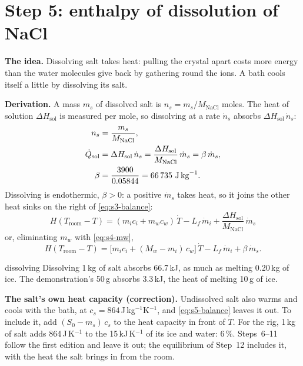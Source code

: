 \documentclass[11pt,a4paper]{article}
\newcommand{\Troom}{T_{\mathrm{room}}}
\newcommand{\Hsol}{\Delta H_{\mathrm{sol}}}
\newcommand{\MN}{M_{\mathrm{NaCl}}}
\newcommand{\para}[1]{\par\smallskip\noindent\textbf{#1}\enspace}
\begin{document}
\section{Step 5: enthalpy of dissolution of NaCl}\label{sec:s5}

\para{The idea.} Dissolving salt takes heat: pulling the crystal apart costs more energy than the water
molecules give back by gathering round the ions. A bath cools itself a little by dissolving its salt.

\para{Derivation.} A mass $m_s$ of dissolved salt is $n_s = m_s/\MN$ moles. The heat of solution $\Hsol$ is
measured per mole, so dissolving at a rate $\dot n_s$ absorbs $\Hsol\,\dot n_s$:
\begin{align}
n_s &= \frac{m_s}{\MN}, \label{eq:s5-ns}\\
\dot Q_{\mathrm{sol}} &= \Hsol\,\dot n_s = \frac{\Hsol}{\MN}\,\dot m_s = \beta\,\dot m_s, \label{eq:s5-Qsol}\\
\beta &= \frac{3900}{0.05844} = 66\,735\ \text{J\,kg}^{-1}. \notag
\end{align}
Dissolving is endothermic, $\beta > 0$: a positive $\dot m_s$ takes heat, so it joins the other heat sinks
on the right of \eqref{eq:s3-balance}:
\begin{equation}
\boxed{\,H(\Troom - T) = (m_ic_i + m_wc_w)\,\dot T - L_f\,\dot m_i + \frac{\Hsol}{\MN}\,\dot m_s\,} \label{eq:s5-balance}
\end{equation}
or, eliminating $m_w$ with \eqref{eq:s4-mw},
\begin{equation}
H(\Troom - T) = \big[m_ic_i + (M_w - m_i)\,c_w\big]\,\dot T - L_f\,\dot m_i + \beta\,\dot m_s . \label{eq:s5-balance2}
\end{equation}

\begin{worked}{dissolving}
Dissolving 1\,kg of salt absorbs 66.7\,kJ, as much as melting 0.20\,kg of ice. The demonstration's 50\,g
absorbs 3.3\,kJ, the heat of melting 10\,g of ice.
\end{worked}

\para{The salt's own heat capacity (correction).} Undissolved salt also warms and cools with the bath, at
$c_s = 864$\,J\,kg$^{-1}$K$^{-1}$, and \eqref{eq:s5-balance} leaves it out. To include it, add
$(S_0 - m_s)\,c_s$ to the heat capacity in front of $\dot T$. For the rig, 1\,kg of salt adds 864\,J\,K$^{-1}$
to the 15\,kJ\,K$^{-1}$ of its ice and water: 6\,\%. Steps~6--11 follow the first edition and leave it out;
the equilibrium of Step~12 includes it, with the heat the salt brings in from the room.
\end{document}
